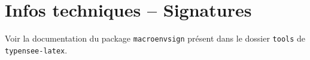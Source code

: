 \section{Infos techniques -- Signatures}

Voir la documentation du package \verb+macroenvsign+ présent dans le dossier \verb+tools+ de \verb+typensee-latex+.
